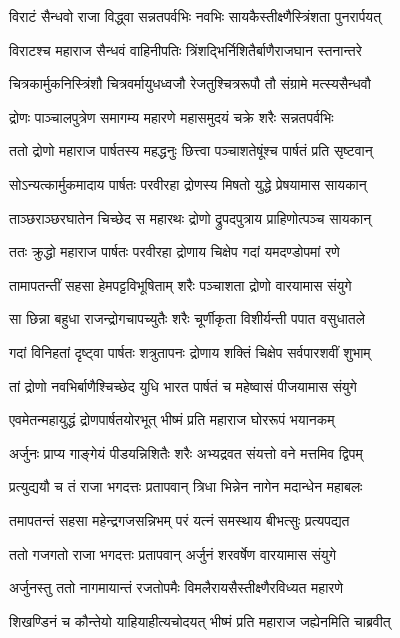 \twolineshloka
{विराटं सैन्धवो राजा विद्ध्वा सन्नतपर्वभिः}
{नवभिः सायकैस्तीक्ष्णैस्त्रिंशता पुनरार्पयत्}


\twolineshloka
{विराटश्च महाराज सैन्धवं वाहिनीपतिः}
{त्रिंशद्भिर्निशितैर्बाणैराजघान स्तनान्तरे}


\twolineshloka
{चित्रकार्मुकनिस्त्रिंशौ चित्रवर्मायुधध्वजौ}
{रेजतुश्चित्ररूपौ तौ संग्रामे मत्स्यसैन्धवौ}


\twolineshloka
{द्रोणः पाञ्चालपुत्रेण समागम्य महारणे}
{महासमुदयं चक्रे शरैः सन्नतपर्वभिः}


\twolineshloka
{ततो द्रोणो महाराज पार्षतस्य महद्धनुः}
{छित्त्वा पञ्चाशतेषूंश्च पार्षतं प्रति सृष्टवान्}


\twolineshloka
{सोऽन्यत्कार्मुकमादाय पार्षतः परवीरहा}
{द्रोणस्य मिषतो युद्धे प्रेषयामास सायकान्}


\twolineshloka
{ताञ्छराञ्छरघातेन चिच्छेद स महारथः}
{द्रोणो द्रुपदपुत्राय प्राहिणोत्पञ्च सायकान्}


\twolineshloka
{ततः क्रुद्धो महाराज पार्षतः परवीरहा}
{द्रोणाय चिक्षेप गदां यमदण्डोपमां रणे}


\twolineshloka
{तामापतन्तीं सहसा हेमपट्टविभूषिताम्}
{शरैः पञ्चाशता द्रोणो वारयामास संयुगे}


\twolineshloka
{सा छिन्ना बहुधा राजन्द्रोगचापच्युतैः शरैः}
{चूर्णीकृता विशीर्यन्ती पपात वसुधातले}


\twolineshloka
{गदां विनिहतां दृष्ट्वा पार्षतः शत्रुतापनः}
{द्रोणाय शक्तिं चिक्षेप सर्वपारशवीं शुभाम्}


\twolineshloka
{तां द्रोणो नवभिर्बाणैश्चिच्छेद युधि भारत}
{पार्षतं च महेष्वासं पीजयामास संयुगे}


\twolineshloka
{एवमेतन्महायुद्धं द्रोणपार्षतयोरभूत्}
{भीष्मं प्रति महाराज घोररूपं भयानकम्}


\twolineshloka
{अर्जुनः प्राप्य गाङ्गेयं पीडयन्निशितैः शरैः}
{अभ्यद्रवत संयत्तो वने मत्तमिव द्विपम्}


\twolineshloka
{प्रत्युद्ययौ च तं राजा भगदत्तः प्रतापवान्}
{त्रिधा भिन्नेन नागेन मदान्धेन महाबलः}


\twolineshloka
{तमापतन्तं सहसा महेन्द्रगजसन्निभम्}
{परं यत्नं समस्थाय बीभत्सुः प्रत्यपद्यत}


\twolineshloka
{ततो गजगतो राजा भगदत्तः प्रतापवान्}
{अर्जुनं शरवर्षेण वारयामास संयुगे}


\twolineshloka
{अर्जुनस्तु ततो नागमायान्तं रजतोपमैः}
{विमलैरायसैस्तीक्ष्णैरविध्यत महारणे}


\twolineshloka
{शिखण्डिनं च कौन्तेयो याहियाहीत्यचोदयत्}
{भीष्मं प्रति महाराज जह्येनमिति चाब्रवीत्}


